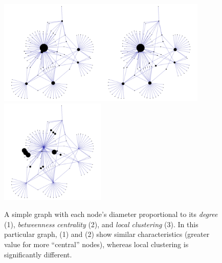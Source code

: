 \begin{figure}
\includegraphics[height=5cm]{simplegraph_by_some_metrics.png}\includegraphics[height=5cm]{simplegraph_by_some_metrics2.png}\includegraphics[height=5cm]{simplegraph_by_some_metrics3.png}
\caption{A simple graph with each node's diameter proportional to its \textsl{degree} (1), \textsl{betweenness centrality} (2), and \textsl{local clustering} (3).
In this particular graph, (1) and (2) show similar characteristics (greater value for more ``central'' nodes), whereas local clustering is significantly different.}
\label{fig:simplegraph_by_some_metrics}
\end{figure}
